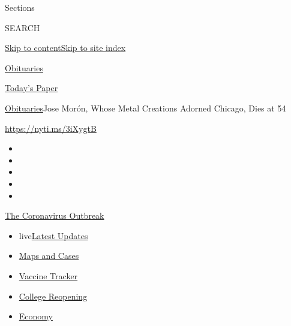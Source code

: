 Sections

SEARCH

\protect\hyperlink{site-content}{Skip to
content}\protect\hyperlink{site-index}{Skip to site index}

\href{https://www.nytimes.com/section/obituaries}{Obituaries}

\href{https://myaccount.nytimes.com/auth/login?response_type=cookie\&client_id=vi}{}

\href{https://www.nytimes.com/section/todayspaper}{Today's Paper}

\href{/section/obituaries}{Obituaries}\textbar{}Jose Morón, Whose Metal
Creations Adorned Chicago, Dies at 54

\url{https://nyti.ms/3iXygtB}

\begin{itemize}
\item
\item
\item
\item
\item
\end{itemize}

\href{https://www.nytimes.com/news-event/coronavirus?action=click\&pgtype=Article\&state=default\&region=TOP_BANNER\&context=storylines_menu}{The
Coronavirus Outbreak}

\begin{itemize}
\tightlist
\item
  live\href{https://www.nytimes.com/2020/08/03/world/coronavirus-covid-19.html?action=click\&pgtype=Article\&state=default\&region=TOP_BANNER\&context=storylines_menu}{Latest
  Updates}
\item
  \href{https://www.nytimes.com/interactive/2020/us/coronavirus-us-cases.html?action=click\&pgtype=Article\&state=default\&region=TOP_BANNER\&context=storylines_menu}{Maps
  and Cases}
\item
  \href{https://www.nytimes.com/interactive/2020/science/coronavirus-vaccine-tracker.html?action=click\&pgtype=Article\&state=default\&region=TOP_BANNER\&context=storylines_menu}{Vaccine
  Tracker}
\item
  \href{https://www.nytimes.com/2020/08/02/us/covid-college-reopening.html?action=click\&pgtype=Article\&state=default\&region=TOP_BANNER\&context=storylines_menu}{College
  Reopening}
\item
  \href{https://www.nytimes.com/live/2020/08/03/business/stock-market-today-coronavirus?action=click\&pgtype=Article\&state=default\&region=TOP_BANNER\&context=storylines_menu}{Economy}
\end{itemize}


